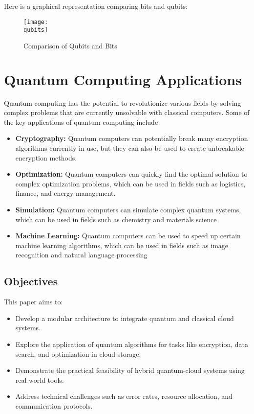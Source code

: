 \documentclass[12pt,a4paper]{article}
\newcommand{\qubits}{D:/SEM-5/FSDC/quantum-cloud-integration/images/qubits_vs_bits.png}
\begin{document}
Here is a graphical representation comparing bits and qubits:

\begin{figure}[h!]
    \centering
    \texttt{[image: \\qubits]}
    \caption{Comparison of Qubits and Bits}
    \label{fig:qubits_vs_bits}
\end{figure}

\newpage

\begin{center}
    \fontsize{14}{16}\selectfont \bfseries
    \section{Quantum Computing Applications}
\end{center}
    
Quantum computing has the potential to revolutionize various fields by solving complex problems that are currently unsolvable
with classical computers. Some of the key applications of quantum computing include
\begin{itemize}
\item \textbf{Cryptography:} Quantum computers can potentially break many encryption algorithms currently in
use, but they can also be used to create unbreakable encryption methods.
\item \textbf{Optimization:} Quantum computers can quickly find the optimal solution to complex
optimization problems, which can be used in fields such as logistics, finance, and energy management.
\item \textbf{Simulation:} Quantum computers can simulate complex quantum systems, which can be used in
fields such as chemistry and materials science
\item \textbf{Machine Learning:} Quantum computers can be used to speed up certain machine 
learning algorithms, which can be used in fields such as image recognition and natural language processing

\end{itemize}


\subsection{Objectives}
This paper aims to:
\begin{itemize}
   \item Develop a modular architecture to integrate quantum and classical cloud systems.
   \item Explore the application of quantum algorithms for tasks like encryption, data search, and optimization in cloud storage.
   \item Demonstrate the practical feasibility of hybrid quantum-cloud systems using real-world tools.
   \item Address technical challenges such as error rates, resource allocation, and communication protocols.
\end{itemize}
\end{document}

